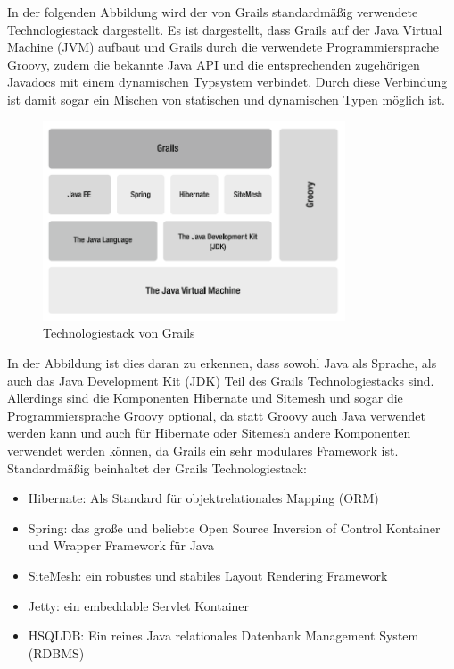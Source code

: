 In der folgenden Abbildung wird der von Grails standardmäßig verwendete Technologiestack dargestellt. Es ist dargestellt, dass Grails auf der Java Virtual Machine (JVM) aufbaut und Grails durch die verwendete Programmiersprache Groovy, zudem die bekannte Java API und die entsprechenden zugehörigen Javadocs mit einem dynamischen Typsystem verbindet. Durch diese Verbindung ist damit sogar ein Mischen von statischen und dynamischen Typen möglich ist. 
\begin{figure}[h]
\centering
\includegraphics[width=0.80\textwidth]{img/Grails-Stack.png}
\caption {Technologiestack von Grails}
\end{figure} 
In der Abbildung ist dies daran zu erkennen, dass sowohl Java als Sprache, als auch das Java Development Kit (JDK) Teil des Grails Technologiestacks sind. Allerdings sind die Komponenten Hibernate und Sitemesh und sogar die Programmiersprache Groovy optional, da statt Groovy auch Java verwendet werden kann und auch für Hibernate oder Sitemesh andere Komponenten verwendet werden können, da Grails ein sehr modulares Framework ist. Standardmäßig beinhaltet der Grails Technologiestack:
\begin{itemize}
\item Hibernate: Als Standard für objektrelationales Mapping (ORM)
\item Spring: das große und beliebte Open Source Inversion of Control Kontainer und Wrapper Framework für Java
\item SiteMesh: ein robustes und stabiles Layout Rendering Framework
\item Jetty: ein embeddable Servlet Kontainer
\item HSQLDB: Ein reines Java relationales Datenbank Management System (RDBMS) 
\end{itemize}